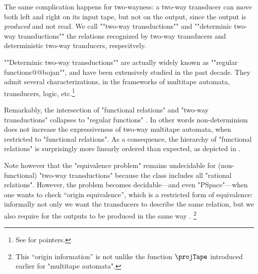 The same complication happens for two-wayness: a two-way transducer can
move both left and right on its input tape, but not on the output,
since the output is \emph{produced} and not read.
We call \AP""two-way transductions"" and ""determinic two-way transductions""
the relations recognized by two-way transducers and deterministic two-way tranducers, respecitvely.

""Determinic two-way transductions"" are actually widely 
known as \AP""regular functions@@bojan"", and have been extensively studied in the past
decade. They admit several characterizations, in the frameworks of multitape automata, transducers, logic, etc.\footnote{See \cite[4th~Paragraph]{Bojanczyk2022Transducers} for pointers.}

Remarkably, the intersection of "functional relations" and "two-way transductions"
collapses to "regular functions" \cite[Theorem 22, p.~243]{EngelfrietHoogeboom2001transduction}.
In other words non-determinism does not increase the expressiveness of two-way multitape automata, when restricted to "functional relations".
As a consequence, the hierarchy of "functional relations" is surprisingly more
linearly ordered than expected, as depicted in .

Note however that the "equivalence problem" remains undecidable for (non-functional)
"two-way transductions" because the class includes all "rational relations".
However, the problem becomes decidable---and even "PSpace"---when one wants to
check ``origin equivalence'', which is a restricted form of equivalence:
informally not only we want the transducers to describe the same relation, but
we also require for the outputs to be produced in the same way \cite[Theorem~1]{BoseMuschollPuppisPenelle2018OriginEquivalence}.%
\footnote{This ``origin information'' is not unlike the function
$\projTape$ introduced earlier for "multitape automata".}

